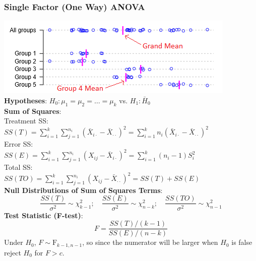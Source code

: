 \documentclass{article}
\begin{document}
\begin{multicols*}{2}
{\color{magenta}\subsubsection*{Single Factor (One Way) ANOVA}}
\includegraphics[width=\linewidth]{ANOVA.png}
\textbf{Hypotheses}: $H_{0}: \mu_{1} = \mu_{2} = \dots = \mu_{k}$ vs. $H_{1}: \bar{H}_{0}$\\
\textbf{Sum of Squares}:\\
Treatment SS:\\
$SS(T) = \sum_{i=1}^{k} \sum_{j=1}^{n_{i}} (\bar{X}_{i\cdot} - \bar{X}_{\cdot \cdot})^{2} = \sum_{i=1}^{k} n_{i} (\bar{X}_{i\cdot} - \bar{X}_{\cdot \cdot})^{2}$\\
Error SS:\\
$SS(E) = \sum_{i=1}^{k} \sum_{j=1}^{n_{i}} (X_{ij} - \bar{X}_{i\cdot})^{2} = \sum_{i=1}^{k} (n_{i} - 1) S_{i}^{2}$\\
Total SS:\\
$SS(TO) = \sum_{i=1}^{k} \sum_{j=1}^{n_{i}} (X_{ij} - \bar{X}_{\cdot \cdot})^{2} = SS(T) + SS(E)$\\
\textbf{Null Distributions of Sum of Squares Terms}:
$$\frac{SS(T)}{\sigma^{2}} \sim \chi^{2}_{k-1}; \quad \frac{SS(E)}{\sigma^{2}} \sim \chi^{2}_{n-k}; \quad \frac{SS(TO)}{\sigma^{2}} \sim \chi^{2}_{n-1}$$
\textbf{Test Statistic (F-test)}:
$$F = \frac{SS(T) / (k-1)}{SS(E) / (n-k)}$$
Under $H_{0}$, $F \sim \mbox{F}_{k-1, n-1}$, so since the numerator will be larger when $H_{0}$ is false reject $H_{0}$ for $F > c$.


\end{multicols*}
\end{document}
